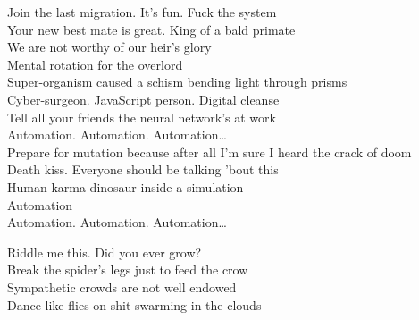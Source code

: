 \label{album:kg}








Join the last migration. It's fun. Fuck the system \\
Your new best mate is great. King of a bald primate \\
We are not worthy of our heir's glory \\
Mental rotation for the overlord \\

Super-organism caused a schism bending light through prisms \\
Cyber-surgeon. JavaScript person. Digital cleanse \\
Tell all your friends the neural network's at work \\

Automation. Automation. Automation… \\

Prepare for mutation because after all I'm sure I heard the crack of doom \\
Death kiss. Everyone should be talking 'bout this \\
Human karma dinosaur inside a simulation \\
Automation \\

Automation. Automation. Automation… \\




Riddle me this. Did you ever grow? \\
Break the spider's legs just to feed the crow \\
Sympathetic crowds are not well endowed \\
Dance like flies on shit swarming in the clouds \\

